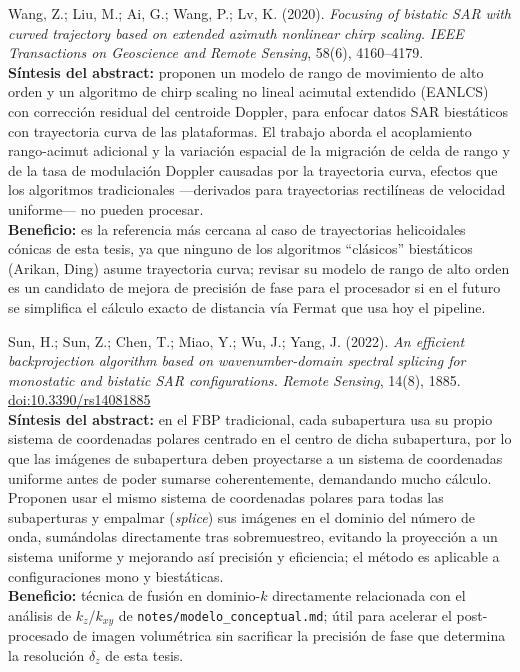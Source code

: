 \documentclass[11pt,a4paper]{article}
\begin{document}
\begin{enumerate}[label=\textbf{[B\arabic*]}, leftmargin=2.2cm, itemsep=10pt]
\item Wang, Z.; Liu, M.; Ai, G.; Wang, P.; Lv, K. (2020). \textit{Focusing of
bistatic SAR with curved trajectory based on extended azimuth nonlinear
chirp scaling.} \emph{IEEE Transactions on Geoscience and Remote Sensing},
58(6), 4160--4179. \cite{wang2020}\\
\textbf{Síntesis del abstract:} proponen un modelo de rango de movimiento
de alto orden y un algoritmo de chirp scaling no lineal acimutal extendido
(EANLCS) con corrección residual del centroide Doppler, para enfocar datos
SAR biestáticos con trayectoria curva de las plataformas. El trabajo aborda
el acoplamiento rango-acimut adicional y la variación espacial de la
migración de celda de rango y de la tasa de modulación Doppler causadas por
la trayectoria curva, efectos que los algoritmos tradicionales —derivados
para trayectorias rectilíneas de velocidad uniforme— no pueden procesar.\\
\textbf{Beneficio:} es la referencia más cercana al caso de trayectorias
helicoidales cónicas de esta tesis, ya que ninguno de los algoritmos
``clásicos'' biestáticos (Arikan, Ding) asume trayectoria curva; revisar su
modelo de rango de alto orden es un candidato de mejora de precisión de
fase para el procesador si en el futuro se simplifica el cálculo exacto de
distancia vía Fermat que usa hoy el pipeline.

\item Sun, H.; Sun, Z.; Chen, T.; Miao, Y.; Wu, J.; Yang, J. (2022).
\textit{An efficient backprojection algorithm based on wavenumber-domain
spectral splicing for monostatic and bistatic SAR configurations.}
\emph{Remote Sensing}, 14(8), 1885.
\href{https://doi.org/10.3390/rs14081885}{doi:10.3390/rs14081885}
\cite{sun2022}\\
\textbf{Síntesis del abstract:} en el FBP tradicional, cada subapertura usa
su propio sistema de coordenadas polares centrado en el centro de dicha
subapertura, por lo que las imágenes de subapertura deben proyectarse a un
sistema de coordenadas uniforme antes de poder sumarse coherentemente,
demandando mucho cálculo. Proponen usar el mismo sistema de coordenadas
polares para todas las subaperturas y empalmar (\emph{splice}) sus imágenes
en el dominio del número de onda, sumándolas directamente tras
sobremuestreo, evitando la proyección a un sistema uniforme y mejorando así
precisión y eficiencia; el método es aplicable a configuraciones mono y
biestáticas.\\
\textbf{Beneficio:} técnica de fusión en dominio-$k$ directamente
relacionada con el análisis de $k_z$/$k_{xy}$ de
\texttt{notes/modelo\_conceptual.md}; útil para acelerar el post-procesado
de imagen volumétrica sin sacrificar la precisión de fase que determina la
resolución $\delta_z$ de esta tesis.


\end{enumerate}
\end{document}
